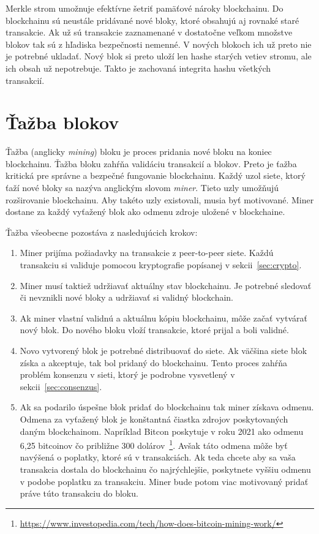 Merkle strom umožnuje efektívne šetriť pamäťové nároky blockchainu. Do blockchainu sú neustále pridávané nové bloky, ktoré obsahujú aj rovnaké staré transakcie. Ak už sú transakcie zaznamenané v dostatočne veľkom množstve blokov tak sú z hľadiska bezpečnosti nemenné. V nových blokoch ich už preto nie je potrebné ukladať. Nový blok si preto uloží len hashe starých vetiev stromu, ale ich obsah už nepotrebuje. Takto je zachovaná integrita hashu všetkých transakcií.~\cite{satoshiBitcoin}

\section{Ťažba blokov}\label{sec:mining}

Ťažba (anglicky \textit{mining}) bloku je proces pridania nové bloku na koniec blockchainu. Ťažba bloku zahŕňa validáciu transakcií a blokov. Preto je ťažba kritická pre správne a bezpečné fungovanie blockchainu. Každý uzol siete, ktorý ťaží nové bloky sa nazýva anglickým slovom \textit{miner}. Tieto uzly umožňujú rozširovanie blockchainu. Aby takéto uzly existovali, musia byť motivované. Miner dostane za každý vyťažený blok ako odmenu zdroje uložené v blockchaine.

Ťažba všeobecne pozostáva z nasledujúcich krokov:
\begin{enumerate}
	\item Miner prijíma požiadavky na transakcie z peer-to-peer siete. Každú transakciu si validuje pomocou kryptografie popísanej v sekcii~\ref{sec:crypto}.
	\item Miner musí taktiež udržiavať aktuálny stav blockchainu. Je potrebné sledovať či nevznikli nové bloky a udržiavať si validný blockchain.
	\item Ak miner vlastní validnú a aktuálnu kópiu blockchainu, môže začať vytvárať nový blok. Do nového bloku vloží transakcie, ktoré prijal a boli validné.
	\item Novo vytvorený blok je potrebné distribuovať do siete. Ak väčšina siete blok získa a akceptuje, tak bol pridaný do blockchainu. Tento proces zahŕňa problém konsenzu v sieti, ktorý je podrobne vysvetlený v sekcii~\ref{sec:consenzus}.
	\item Ak sa podarilo úspešne blok pridať do blockchainu tak miner získava odmenu. Odmena za vyťažený blok je konštantná čiastka zdrojov poskytovaných daným blockchainom. Napríklad Bitcon poskytuje v roku 2021 ako odmenu 6,25 bitcoinov čo približne 300 dolárov~\footnote{\url{https://www.investopedia.com/tech/how-does-bitcoin-mining-work/}}. Avšak táto odmena môže byť navýšená o poplatky, ktoré sú v transakciách. Ak teda chcete aby sa vaša transakcia dostala do blockchainu čo najrýchlejšie, poskytnete vyššiu odmenu v podobe poplatku za transakciu. Miner bude potom viac motivovaný pridať práve túto transakciu do bloku.
\end{enumerate}

